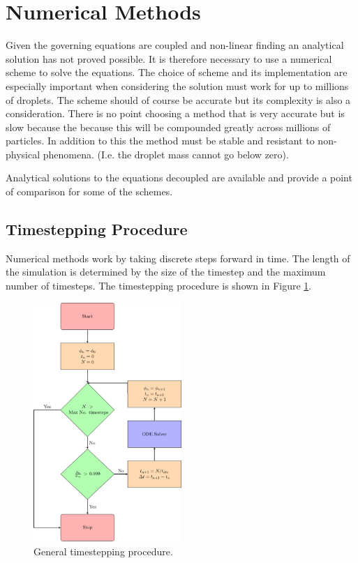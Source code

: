 \documentclass[../Interim_Report_Master]{subfiles}
\begin{document}
\hypertarget{num_meth}{\section{Numerical Methods}\label{num_meth}}
Given the governing equations are coupled and non-linear finding an analytical solution has not proved possible. It is therefore necessary to use a numerical scheme to solve the equations. The choice of scheme and its implementation are especially important when considering the solution must work for up to millions of droplets. The scheme should of course be accurate but its complexity is also a consideration. There is no point choosing a method that is very accurate but is slow because the because this will be compounded greatly across millions of particles. In addition to this the method must be stable and resistant to non-physical phenomena. (I.e. the droplet mass cannot go below zero).


Analytical solutions to the equations decoupled are available and provide a point of comparison for some of the schemes.

\subsection{Timestepping Procedure}
Numerical methods work by taking discrete steps forward in time. The length of the simulation is determined by the size of the timestep and the maximum number of timesteps. The timestepping procedure is shown in Figure \ref{timestep_proc}.

\begin{figure}
	\centering
	\includegraphics[width=0.5\textwidth]{./Diagrams/Timestepping_Procedure/Timestepping_Procedure.pdf}
	\caption{General timestepping procedure.}
	\label{timestep_proc}
\end{figure}
\end{document}

